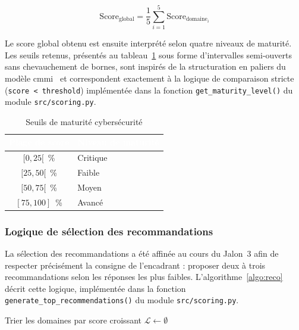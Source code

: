 \begin{equation}
  \text{Score}_{\text{global}} = \frac{1}{5}\sum_{i=1}^{5} \text{Score}_{\text{domaine}_i}
  \label{eq:global_score}
\end{equation}

Le score global obtenu est ensuite interprété selon quatre niveaux de maturité. Les seuils retenus, présentés au tableau~\ref{tab:seuils} sous forme d'intervalles semi-ouverts sans chevauchement de bornes, sont inspirés de la structuration en paliers du modèle \gls{cmmi}~\cite{humphrey1989} et correspondent exactement à la logique de comparaison stricte (\texttt{score < threshold}) implémentée dans la fonction \texttt{get\_maturity\_level()} du module \texttt{src/scoring.py}.

\begin{table}[H]
  \centering
  \caption{Seuils de maturité cybersécurité}
  \label{tab:seuils}
  \renewcommand{\arraystretch}{1.3}
  \begin{tabular}{|c|l|}
    \hline
    \rowcolor{iacsTableHead}
    \textcolor{white}{\textbf{Plage de score}} & \textcolor{white}{\textbf{Niveau de maturité}} \\
    \hline
    $[0, 25[$ \,\% & Critique \\
    \hline
    \rowcolor{iacsLightGray}
    $[25, 50[$ \,\% & Faible \\
    \hline
    $[50, 75[$ \,\% & Moyen \\
    \hline
    \rowcolor{iacsLightGray}
    $[75, 100]$ \,\% & Avancé \\
    \hline
  \end{tabular}
\end{table}

\subsubsection{Logique de sélection des recommandations}

La sélection des recommandations a été affinée au cours du Jalon~3 afin de respecter précisément la consigne de l'encadrant : proposer deux à trois recommandations selon les réponses les plus faibles. L'algorithme~\ref{algo:reco} décrit cette logique, implémentée dans la fonction \texttt{generate\_top\_recommendations()} du module \texttt{src/scoring.py}.

\begin{algorithm}[H]
  \caption{Sélection des recommandations priorisées}
  \label{algo:reco}

  Trier les domaines par score croissant\;
  $\mathcal{L} \leftarrow \emptyset$\;
\end{algorithm}

